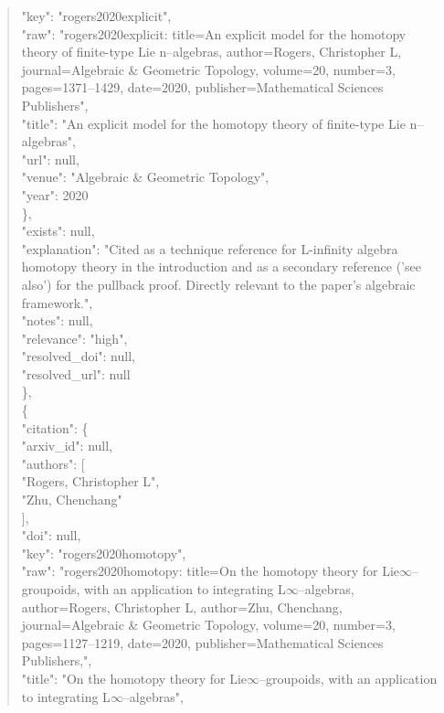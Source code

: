 \documentclass[11pt]{article}
\begin{document}
\begin{quote}
        "key": "rogers2020explicit",\\
        "raw": "rogers2020explicit: title=An explicit model for the homotopy theory of finite-type Lie n--algebras, author=Rogers, Christopher L, journal=Algebraic \& Geometric Topology, volume=20, number=3, pages=1371--1429, date=2020, publisher=Mathematical Sciences Publishers",\\
        "title": "An explicit model for the homotopy theory of finite-type Lie n--algebras",\\
        "url": null,\\
        "venue": "Algebraic \& Geometric Topology",\\
        "year": 2020\\
      \},\\
      "exists": null,\\
      "explanation": "Cited as a technique reference for L-infinity algebra homotopy theory in the introduction and as a secondary reference ('see also') for the pullback proof. Directly relevant to the paper's algebraic framework.",\\
      "notes": null,\\
      "relevance": "high",\\
      "resolved\_doi": null,\\
      "resolved\_url": null\\
    \},\\
    \{\\
      "citation": \{\\
        "arxiv\_id": null,\\
        "authors": [\\
          "Rogers, Christopher L",\\
          "Zhu, Chenchang"\\
        ],\\
        "doi": null,\\
        "key": "rogers2020homotopy",\\
        "raw": "rogers2020homotopy: title=On the homotopy theory for Lie\ensuremath{\infty}--groupoids, with an application to integrating L\ensuremath{\infty}--algebras, author=Rogers, Christopher L, author=Zhu, Chenchang, journal=Algebraic \& Geometric Topology, volume=20, number=3, pages=1127--1219, date=2020, publisher=Mathematical Sciences Publishers,",\\
        "title": "On the homotopy theory for Lie\ensuremath{\infty}--groupoids, with an application to integrating L\ensuremath{\infty}--algebras",\\

\end{quote}
\end{document}

